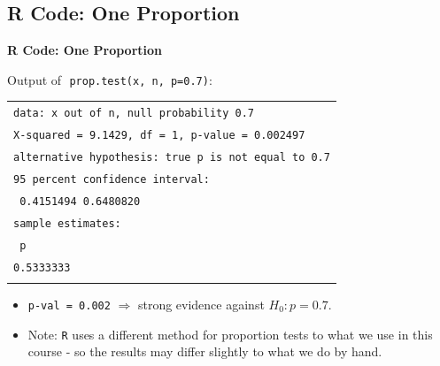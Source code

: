 \documentclass[compress]{beamer}        %
\makeatletter
\newcommand{\tcb}{\textcolor{beamer@blendedblue}}
\makeatother
\begin{document}
\subsection{R Code: One Proportion}
\begin{frame}{\bf \tcb{R Code: One Proportion}}

Output of\,\, \texttt{prop.test(x, n, p=0.7)}:\\[0.2cm]
\begin{tabular}{|l|}
\hline
\texttt{data:  x out of n, null probability 0.7}\\
\texttt{X-squared = 9.1429, df = 1, p-value = 0.002497}\\
\texttt{alternative hypothesis: true p is not equal to 0.7}\\
\texttt{95 percent confidence interval:}\\
\texttt{ 0.4151494 0.6480820}\\
\texttt{sample estimates:}\\
\texttt{        p}\\
\texttt{0.5333333}\\
\hline
\multicolumn{1}{c}{}\\[-0.1cm]
\end{tabular}
\begin{itemize}\itemsep0.4cm
\item \texttt{p-val = 0.002} $\Rightarrow$ strong evidence against $H_0:  p = 0.7$.
\item Note: \texttt{R} uses a different method for proportion tests to what we use in this course - so the results may differ slightly to what we do by hand.
\end{itemize}

\end{frame}
\end{document}
